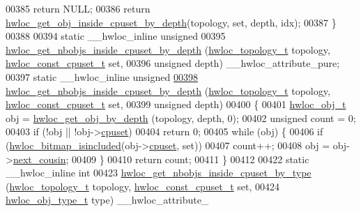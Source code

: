 \begin{DoxyCode}
{{00385     \textcolor{keywordflow}{return} NULL;
00386   \textcolor{keywordflow}{return} \hyperlink{a00054_ga57c8a0e227d1b16a31d19aaf755b42c0}{hwloc_get_obj_inside_cpuset_by_depth}(topology, \textcolor{keyword}{set}, depth, idx);
00387 \}
00388 
00394 \textcolor{keyword}{static} \_\_hwloc\_inline \textcolor{keywordtype}{unsigned}
00395 \hyperlink{a00054_ga457604a2dedbf70ba3b480558666b56b}{hwloc_get_nbobjs_inside_cpuset_by_depth} (\hyperlink{a00039_ga9d1e76ee15a7dee158b786c30b6a6e38}{hwloc_topology_t} topology, 
      \hyperlink{a00040_ga1f784433e9b606261f62d1134f6a3b25}{hwloc_const_cpuset_t} \textcolor{keyword}{set},
00396                                          \textcolor{keywordtype}{unsigned} depth) \_\_hwloc\_attribute\_pure;
00397 \textcolor{keyword}{static} \_\_hwloc\_inline \textcolor{keywordtype}{unsigned}
\hypertarget{a00031_source_l00398}{}\hyperlink{a00054_ga457604a2dedbf70ba3b480558666b56b}{00398} \hyperlink{a00054_ga457604a2dedbf70ba3b480558666b56b}{hwloc_get_nbobjs_inside_cpuset_by_depth} (\hyperlink{a00039_ga9d1e76ee15a7dee158b786c30b6a6e38}{hwloc_topology_t} topology, 
      \hyperlink{a00040_ga1f784433e9b606261f62d1134f6a3b25}{hwloc_const_cpuset_t} \textcolor{keyword}{set},
00399                                          \textcolor{keywordtype}{unsigned} depth)
00400 \{
00401   \hyperlink{a00016}{hwloc_obj_t} obj = \hyperlink{a00047_gaedd78240b0c1108355586a268ec5a697}{hwloc_get_obj_by_depth} (topology, depth, 0);
00402   \textcolor{keywordtype}{unsigned} count = 0;
00403   \textcolor{keywordflow}{if} (!obj || !obj->\hyperlink{a00016_a67925e0f2c47f50408fbdb9bddd0790f}{cpuset})
00404     \textcolor{keywordflow}{return} 0;
00405   \textcolor{keywordflow}{while} (obj) \{
00406     \textcolor{keywordflow}{if} (\hyperlink{a00065_gaae29e14a926c198e8f91e6e4790621e7}{hwloc_bitmap_isincluded}(obj->\hyperlink{a00016_a67925e0f2c47f50408fbdb9bddd0790f}{cpuset}, \textcolor{keyword}{set}))
00407       count++;
00408     obj = obj->\hyperlink{a00016_a85a788017457129589318b6c39451acf}{next_cousin};
00409   \}
00410   \textcolor{keywordflow}{return} count;
00411 \}
00412 
00422 \textcolor{keyword}{static} \_\_hwloc\_inline \textcolor{keywordtype}{int}
00423 \hyperlink{a00054_ga63481874c69ed257b1a0c03e7615ff97}{hwloc_get_nbobjs_inside_cpuset_by_type} (\hyperlink{a00039_ga9d1e76ee15a7dee158b786c30b6a6e38}{hwloc_topology_t} topology, 
      \hyperlink{a00040_ga1f784433e9b606261f62d1134f6a3b25}{hwloc_const_cpuset_t} \textcolor{keyword}{set},
00424                                         \hyperlink{a00041_gacd37bb612667dc437d66bfb175a8dc55}{hwloc_obj_type_t} type) \_\_hwloc\_attribute\_
}}
\end{DoxyCode}
